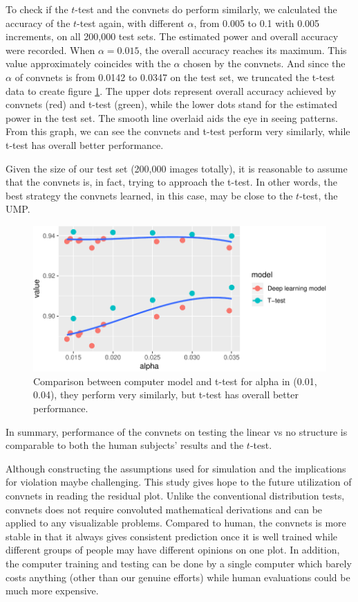 \documentclass[12pt]{article}
\begin{document}
To check if the \(t\)-test and the convnets do perform similarly, we
calculated the accuracy of the \(t\)-test again, with different
\(\alpha\), from 0.005 to 0.1 with 0.005 increments, on all 200,000 test
sets. The estimated power and overall accuracy were recorded. When
\(\alpha=0.015\), the overall accuracy reaches its maximum. This value
approximately coincides with the \(\alpha\) chosen by the convnets. And
since the \(\alpha\) of convnets is from 0.0142 to 0.0347 on the test
set, we truncated the t-test data to create figure \ref{fig:ttdl}. The
upper dots represent overall accuracy achieved by convnets (red) and
t-test (green), while the lower dots stand for the estimated power in
the test set. The smooth line overlaid aids the eye in seeing patterns.
From this graph, we can see the convnets and t-test perform very
similarly, while t-test has overall better performance.

Given the size of our test set (200,000 images totally), it is
reasonable to assume that the convnets is, in fact, trying to approach
the t-test. In other words, the best strategy the convnets learned, in
this case, may be close to the \(t\)-test, the UMP.

\begin{figure}

{\centering \includegraphics{pc_plots_files/figure-latex/ttdl-1} 

}

\caption{Comparison between computer model and t-test for alpha in (0.01, 0.04), they perform very similarly, but t-test has overall better performance.}\label{fig:ttdl}
\end{figure}

In summary, performance of the convnets on testing the linear vs no
structure is comparable to both the human subjects' results and the
\(t\)-test.

Although constructing the assumptions used for simulation and the
implications for violation maybe challenging. This study gives hope to
the future utilization of convnets in reading the residual plot. Unlike
the conventional distribution tests, convnets does not require
convoluted mathematical derivations and can be applied to any
visualizable problems. Compared to human, the convnets is more stable in
that it always gives consistent prediction once it is well trained while
different groups of people may have different opinions on one plot. In
addition, the computer training and testing can be done by a single
computer which barely costs anything (other than our genuine efforts)
while human evaluations could be much more expensive.
\end{document}
